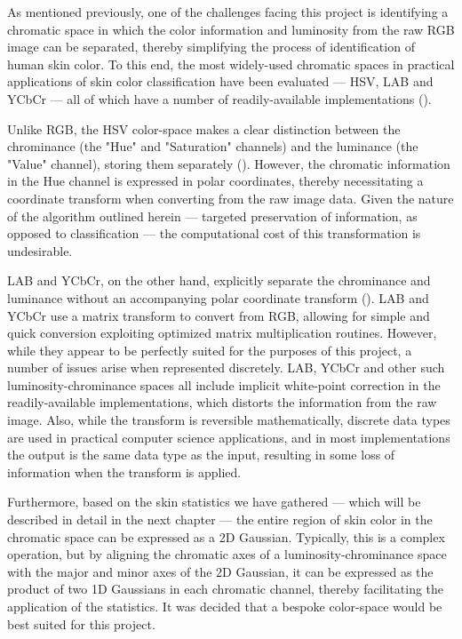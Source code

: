 As mentioned previously, one of the challenges facing this project is identifying a chromatic space in which the color information and luminosity from the raw RGB image can be separated, thereby simplifying the process of identification of human skin color. To this end, the most widely-used chromatic spaces in practical applications of skin color classification have been evaluated --- HSV, LAB and YCbCr --- all of which have a number of readily-available implementations (\cite{Vezhnevets2003,Zarit1999a,Yang1997a,Brand2000a,Sigal2000a,Chai2000a,Phung2002a}).

Unlike RGB, the HSV color-space makes a clear distinction between the chrominance (the "Hue" and "Saturation" channels) and the luminance (the "Value" channel), storing them separately (\cite{Vezhnevets2003,Sigal2000a}). However, the chromatic information in the Hue channel is expressed in polar coordinates, thereby necessitating a coordinate transform when converting from the raw image data. Given the nature of the algorithm outlined herein --- targeted preservation of information, as opposed to classification ---  the computational cost of this transformation is undesirable.

LAB and YCbCr, on the other hand, explicitly separate the chrominance and luminance without an accompanying polar coordinate transform (\cite{Vezhnevets2003,Poynton1997,Phung2002a}). LAB and YCbCr use a matrix transform to convert from RGB, allowing for simple and quick conversion exploiting optimized matrix multiplication routines. However, while they appear to be perfectly suited for the purposes of this project, a number of issues arise when represented discretely. LAB, YCbCr and other such luminosity-chrominance spaces all include implicit white-point correction in the readily-available implementations, which distorts the information from the raw image. Also, while the transform is reversible mathematically, discrete data types are used in practical computer science applications, and in most implementations the output is the same data type as the input, resulting in some loss of information when the transform is applied.

Furthermore, based on the skin statistics we have gathered --- which will be described in detail in the next chapter --- the entire region of skin color in the chromatic space can be expressed as a 2D Gaussian. Typically, this is a complex operation, but by aligning the chromatic axes of a luminosity-chrominance space with the major and minor axes of the 2D Gaussian, it can be expressed as the product of two 1D Gaussians in each chromatic channel, thereby facilitating the application of the statistics. It was decided that a bespoke color-space would be best suited for this project. 

